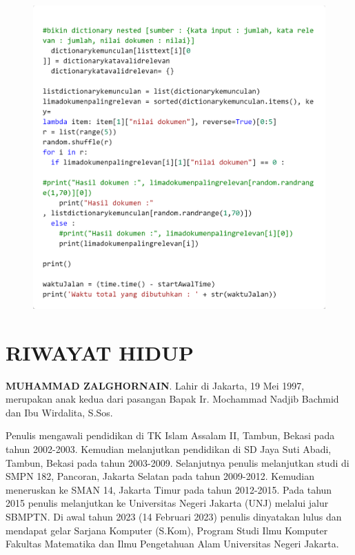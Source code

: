 \documentclass[12pt]{report}
\begin{document}
\begin{figure}[H]
\centering
\includegraphics[scale=0.3]{search4cbow4}
\end{figure}

\newpage
\cleardoublepage
{}
\thispagestyle{plain}
\section*{RIWAYAT HIDUP}

\textbf{MUHAMMAD ZALGHORNAIN}. Lahir di Jakarta, 19 Mei 1997, merupakan anak kedua dari pasangan Bapak Ir. Mochammad Nadjib Bachmid dan Ibu Wirdalita, S.Sos.

Penulis mengawali pendidikan di TK Islam Assalam II, Tambun, Bekasi pada tahun 2002-2003. Kemudian melanjutkan pendidikan di SD Jaya Suti Abadi, Tambun, Bekasi pada tahun 2003-2009. Selanjutnya penulis melanjutkan studi di SMPN 182, Pancoran, Jakarta Selatan pada tahun 2009-2012. Kemudian meneruskan ke SMAN 14, Jakarta Timur  pada tahun 2012-2015. Pada tahun 2015 penulis melanjutkan ke Universitas Negeri Jakarta (UNJ) melalui jalur SBMPTN. Di awal tahun 2023 (14 Februari 2023) penulis dinyatakan lulus dan mendapat gelar Sarjana Komputer (S.Kom), Program Studi Ilmu Komputer Fakultas Matematika dan Ilmu Pengetahuan Alam Universitas Negeri Jakarta.
\end{document}
